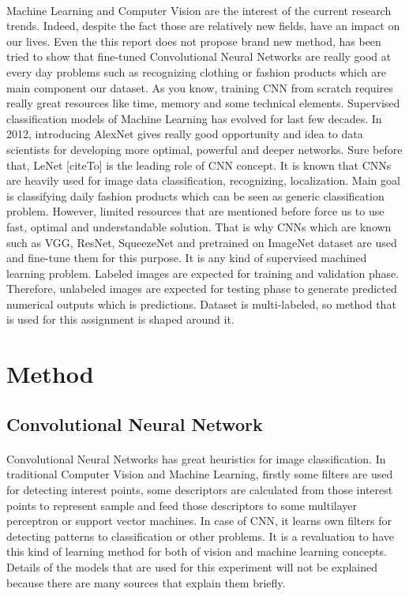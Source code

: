 \documentclass[12pt]{article}
\begin{document}
\paragraph{} Machine Learning and Computer Vision are the interest of the current research trends. Indeed, despite the fact those are relatively new fields, have an impact on our lives. Even the this report does not propose brand new method, has been tried to show that fine-tuned Convolutional Neural Networks are really good at every day problems such as recognizing clothing or fashion products which are main component our dataset. As you know, training CNN from scratch  requires really great resources like time, memory and some technical elements. Supervised  classification models of Machine Learning has evolved for last few decades. In 2012, introducing AlexNet \cite{alexnet}  gives really good opportunity and idea to data scientists for developing more optimal, powerful and deeper networks. Sure before that, LeNet [citeTo] is the leading role of CNN concept. It is known that CNNs are heavily used for image data classification, recognizing, localization. Main goal is classifying daily fashion products which can be seen as generic classification problem. However, limited resources that are mentioned before force us to use fast, optimal and understandable solution. That is why CNNs which are known such as VGG\cite{vggNet}, ResNet\cite{resnet}, SqueezeNet\cite{squeezenet} and pretrained on ImageNet dataset\cite{imageNet} are used and fine-tune them for this purpose. It is any kind of supervised machined learning problem. Labeled images are expected for training and validation phase. Therefore, unlabeled images are expected for testing phase to generate predicted numerical outputs which is predictions. Dataset is multi-labeled, so method that is used for this assignment is shaped around it.            

\section{Method}

\subsection{Convolutional Neural Network}

\paragraph{} Convolutional Neural Networks has great heuristics for image classification. In traditional Computer Vision and Machine Learning, firstly some filters are used for detecting interest points, some descriptors are calculated from those interest points to represent sample and feed those descriptors to some multilayer perceptron or support vector machines. In case of CNN, it learns own filters for detecting patterns to classification or other problems. It is a revaluation to have this kind of learning method for both of vision and machine learning concepts. Details of the models that are used for this experiment will not be explained because there are many sources that explain them briefly.
\end{document}
